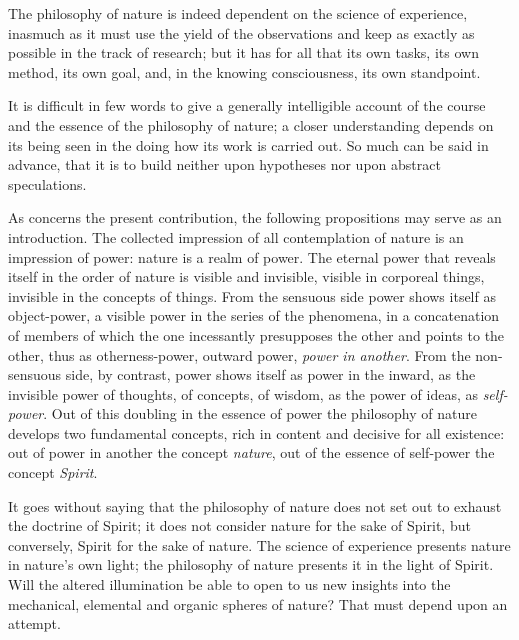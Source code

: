 \documentclass[12pt,a4paper]{book}
\begin{document}
The philosophy of nature is indeed dependent on the science of experience,
inasmuch as it must use the yield of the observations and keep as exactly as
possible in the track of research; but it has for all that its own tasks, its
own method, its own goal, and, in the knowing consciousness, its own
standpoint.

It is difficult in few words to give a generally intelligible account of the
course and the essence of the philosophy of nature; a closer understanding
depends on its being seen in the doing how its work is carried out. So much can
be said in advance, that it is to build neither upon hypotheses nor upon
abstract speculations.

As concerns the present contribution, the following propositions may serve as
an introduction. The collected impression of all contemplation of nature is an
impression of power: nature is a realm of power. The eternal power that reveals
itself in the order of nature is visible and invisible, visible in corporeal
things, invisible in the concepts of things. From the sensuous side power shows
itself as object-power, a visible power in the series of the phenomena, in a
concatenation of members of which the one incessantly presupposes the other and
points to the other, thus as otherness-power, outward power, \emph{power in
another}.
From the non-sensuous side, by contrast, power shows itself as power in the
inward, as the invisible power of thoughts, of concepts, of wisdom, as the
power of ideas, as \emph{self-power}.
Out of this doubling in the essence of power the philosophy of nature develops
two fundamental concepts, rich in content and decisive for all existence: out
of power in another the concept \emph{nature}, out of the essence of self-power
the concept \emph{Spirit}.

It goes without saying that the philosophy of nature does not set out to
exhaust the doctrine of Spirit; it does not consider nature for the sake of
Spirit, but conversely, Spirit for the sake of nature. The science of
experience presents nature in nature's own light; the philosophy of nature
presents it in the light of Spirit. Will the altered illumination be able to
open to us new insights into the mechanical, elemental and organic spheres of
nature? That must depend upon an attempt.
\end{document}
